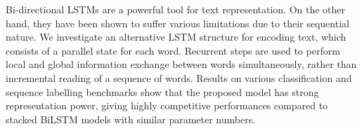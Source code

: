 Bi-directional LSTMs are a powerful tool for text representation. On the other hand, they have been shown to suffer various limitations due to their sequential nature. We investigate an alternative LSTM structure for encoding text, which consists of a parallel state for each word. Recurrent steps are used to perform local and global information exchange between words simultaneously, rather than incremental reading of a sequence of words. Results on various classification and sequence labelling benchmarks show that the proposed model has strong representation power, giving highly competitive performances compared to stacked BiLSTM models with similar parameter numbers.
